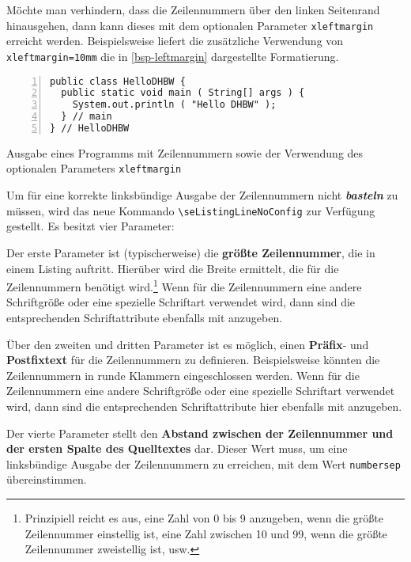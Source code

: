 M\"ochte man verhindern, dass die Zeilennummern \"uber den linken Seitenrand hinausgehen, dann kann dieses mit 
dem optionalen Parameter \verb+xleftmargin+ erreicht werden. Beispielsweise liefert die zus\"atzliche Verwendung von 
\verb+xleftmargin=10mm+ die in \vref{bsp-leftmargin} dargestellte Formatierung.

\begin{programm}[htbp]
\begin{lstlisting}[numbers=left,
firstnumber=1,numbersep=5mm,xleftmargin=10mm]
public class HelloDHBW {
  public static void main ( String[] args ) {
    System.out.println ( "Hello DHBW" );
  } // main
} // HelloDHBW
\end{lstlisting}
\caption{Ausgabe eines Programms mit Zeilennummern sowie der 
Verwendung des optionalen Parameters \texttt{xleftmargin}\label{bsp-leftmargin}}
\end{programm}

Um f\"ur eine korrekte linksb\"undige Ausgabe der Zeilennummern nicht \textsl{\textbf{basteln}} zu m\"ussen, wird das neue 
Kommando \verb+\seListingLineNoConfig+ zur Verf\"ugung gestellt. Es besitzt vier Parameter:

\begin{seList}
\item Der erste Parameter ist (typischerweise) die \textbf{gr\"o{\ss}te Zeilennummer}, die in einem Listing auftritt. Hier\"uber wird die 
Breite ermittelt, die f\"ur die Zeilennummern ben\"otigt wird.\footnote{Prinzipiell reicht es aus, eine Zahl von 0 bis 9 anzugeben, wenn 
die gr\"o{\ss}te Zeilennummer einstellig ist, eine Zahl zwischen 10 und 99, wenn die gr\"o{\ss}te Zeilennummer zweistellig ist, usw.} Wenn f\"ur die 
Zeilennummern eine andere Schriftgr\"o{\ss}e oder eine spezielle Schriftart verwendet wird, dann sind die entsprechenden 
Schriftattribute ebenfalls mit anzugeben.
\item \"Uber den zweiten und dritten Parameter ist es m\"oglich, einen \textbf{Pr\"afix}- und \textbf{Postfixtext} f\"ur die Zeilennummern zu definieren. 
Beispielsweise k\"onnten die Zeilennummern in runde Klammern eingeschlossen werden. 
Wenn f\"ur die 
Zeilennummern eine andere Schriftgr\"o{\ss}e oder eine spezielle Schriftart verwendet wird, dann sind die entsprechenden 
Schriftattribute hier ebenfalls mit anzugeben.
\item Der vierte Parameter stellt den \textbf{Abstand zwischen der Zeilennummer und der ersten Spalte des Quelltextes} dar. Dieser Wert muss, 
um eine linksb\"undige Ausgabe der Zeilennummern zu erreichen, mit dem Wert \verb+numbersep+ \"ubereinstimmen.
\end{seList}

